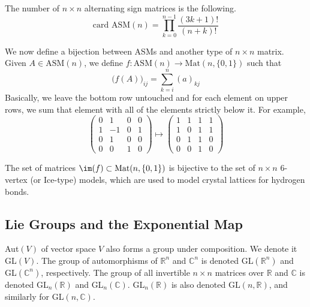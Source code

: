   \begin{theorem}
    The number of $n \times n$ alternating sign matrices is the following. 
    \begin{equation}
      \text{card ASM}(n) = \prod_{k=0}^{n-1} \frac{(3k+1)!}{(n+k)!}
    \end{equation}
  \end{theorem}

  We now define a bijection between ASMs and another type of $n \times n$ matrix. Given $A \in \text{ASM}(n)$, we define $f: \text{ASM}(n) \longrightarrow \text{Mat}(n, \{0,1\})$ such that
  \begin{equation}
    \big(f(A)\big)_{ij} = \sum_{k=i}^n (a)_{kj}
  \end{equation}
  Basically, we leave the bottom row untouched and for each element on upper rows, we sum that element with all of the elements strictly below it. For example, 
  \begin{equation}
    \begin{pmatrix}
        0&1&0&0\\1&-1&0&1\\0&1&0&0\\0&0&1&0
      \end{pmatrix} \mapsto \begin{pmatrix}
        1&1&1&1\\1&0&1&1\\0&1&1&0\\0&0&1&0
    \end{pmatrix}
  \end{equation}

  \begin{theorem}
    The set of matrices $\im(f) \subset \text{Mat}(n, \{0, 1\})$ is bijective to the set of $n \times n$ 6-vertex (or Ice-type) models, which are used to model crystal lattices for hydrogen bonds. 
  \end{theorem}

\subsection{Lie Groups and the Exponential Map}

  \begin{definition}
    Aut$(V)$ of vector space $V$ also forms a group under composition. We denote it GL$(V)$. The group of automorphisms of $\mathbb{R}^n$ and $\mathbb{C}^n$ is denoted GL$(\mathbb{R}^n)$ and GL$(\mathbb{C}^n)$, respectively. The group of all invertible $n \times n$ matrices over $\mathbb{R}$ and $\mathbb{C}$ is denoted GL$_n(\mathbb{R})$ and GL$_n(\mathbb{C})$. GL$_n(\mathbb{R})$ is also denoted GL$(n, \mathbb{R})$, and similarly for GL$(n, \mathbb{C})$. 
  \end{definition}

